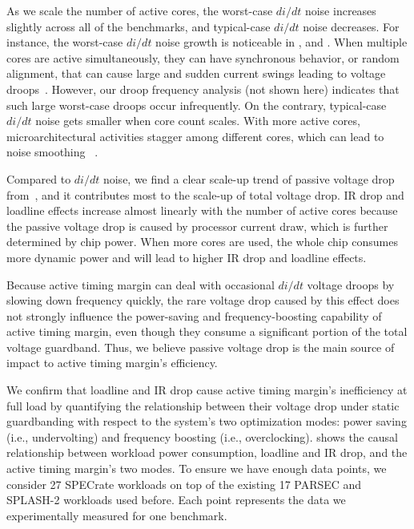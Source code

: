 As we scale the number of active cores, the worst-case $di/dt$ noise increases slightly across all of the benchmarks, and typical-case $di/dt$ noise decreases. For instance, the worst-case $di/dt$ noise growth is noticeable in ,  and . When multiple cores are active simultaneously, they can have synchronous behavior, or random alignment, that can cause large and sudden current swings leading to voltage droops~\cite{reddi2010voltage,miller2012vrsync,kim2012audit}. However, our droop frequency analysis (not shown here) indicates that such large worst-case droops occur infrequently. On the contrary, typical-case $di/dt$ noise gets smaller when core count scales. With more active cores, microarchitectural activities stagger among different cores, which can lead to noise smoothing ~\cite{miller2012vrsync,reddi2010voltage}.

Compared to $di/dt$ noise, we find a clear scale-up trend of passive voltage drop from~, and it contributes most to the scale-up of total voltage drop. IR drop and loadline effects increase almost linearly with the number of active cores because the passive voltage drop is caused by processor current draw, which is further determined by chip power. When more cores are used, the whole chip consumes more dynamic power and will lead to higher IR drop and loadline effects.

Because active timing margin can deal with occasional $di/dt$ voltage droops by slowing down frequency quickly, the rare voltage drop caused by this effect does not strongly influence the power-saving and frequency-boosting capability of active timing margin, even though they consume a significant portion of the total voltage guardband. Thus, we believe passive voltage drop is the main source of impact to active timing margin's efficiency. 

We confirm that loadline and IR drop cause active timing margin's inefficiency at full load by quantifying the relationship between their voltage drop under static guardbanding with respect to the system's two optimization modes: power saving (i.e., undervolting) and frequency boosting (i.e., overclocking).  shows the causal relationship between workload power consumption, loadline and IR drop, and the active timing margin's two modes. To ensure we have enough data points, we consider 27 SPECrate workloads on top of the existing 17 PARSEC and SPLASH-2 workloads used before. Each point represents the data we experimentally measured for one benchmark.

